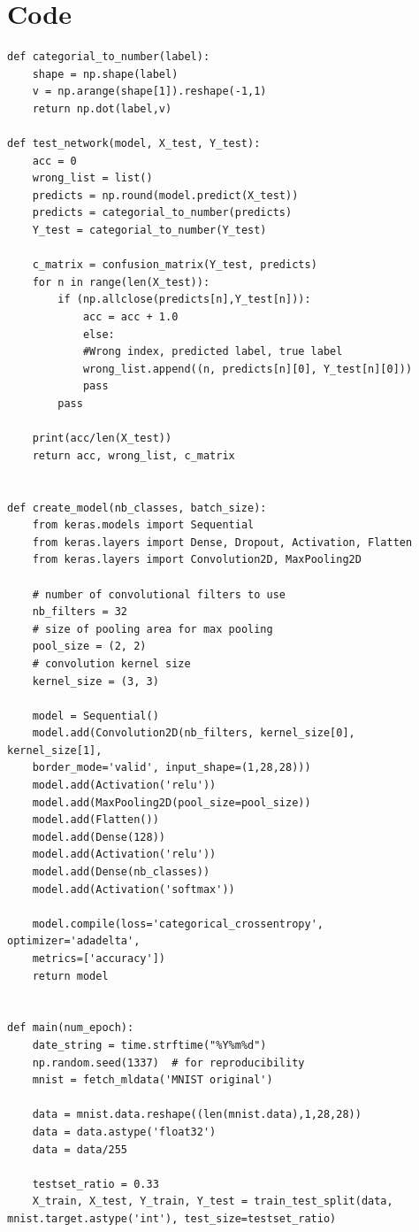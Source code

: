 \documentclass[paper=a4, fontsize=11pt]{scrartcl} %
\begin{document}
\section{Code}
\begin{lstlisting}
def categorial_to_number(label):
    shape = np.shape(label)
    v = np.arange(shape[1]).reshape(-1,1)
    return np.dot(label,v)

def test_network(model, X_test, Y_test):
    acc = 0
    wrong_list = list()
    predicts = np.round(model.predict(X_test))
    predicts = categorial_to_number(predicts)
    Y_test = categorial_to_number(Y_test)

    c_matrix = confusion_matrix(Y_test, predicts)
    for n in range(len(X_test)):
        if (np.allclose(predicts[n],Y_test[n])):
            acc = acc + 1.0
            else:
            #Wrong index, predicted label, true label
            wrong_list.append((n, predicts[n][0], Y_test[n][0]))
            pass
        pass

    print(acc/len(X_test))
    return acc, wrong_list, c_matrix


def create_model(nb_classes, batch_size):
    from keras.models import Sequential
    from keras.layers import Dense, Dropout, Activation, Flatten
    from keras.layers import Convolution2D, MaxPooling2D

    # number of convolutional filters to use
    nb_filters = 32
    # size of pooling area for max pooling
    pool_size = (2, 2)
    # convolution kernel size
    kernel_size = (3, 3)

    model = Sequential()
    model.add(Convolution2D(nb_filters, kernel_size[0], kernel_size[1],
    border_mode='valid', input_shape=(1,28,28)))
    model.add(Activation('relu'))
    model.add(MaxPooling2D(pool_size=pool_size))
    model.add(Flatten())
    model.add(Dense(128))
    model.add(Activation('relu'))
    model.add(Dense(nb_classes))
    model.add(Activation('softmax'))
    
    model.compile(loss='categorical_crossentropy', optimizer='adadelta',
    metrics=['accuracy'])
    return model


def main(num_epoch):
    date_string = time.strftime("%Y%m%d")
    np.random.seed(1337)  # for reproducibility
    mnist = fetch_mldata('MNIST original')

    data = mnist.data.reshape((len(mnist.data),1,28,28))
    data = data.astype('float32')
    data = data/255

    testset_ratio = 0.33
    X_train, X_test, Y_train, Y_test = train_test_split(data, mnist.target.astype('int'), test_size=testset_ratio)


\end{lstlisting}
\end{document}
